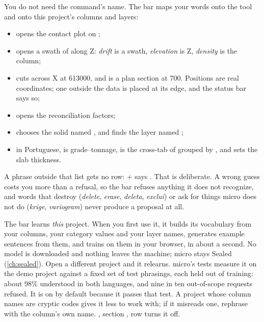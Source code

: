 You do not need the command's name. The bar maps your words onto the tool and onto this project's columns and layers:
\begin{itemize}
\item {} opens the contact plot on ;
\item {} opens a swath of  along Z: \emph{drift} is a swath, \emph{elevation} is Z, \emph{density} is the  column;
\item {} cuts across X at 613000, and  is a plan section at 700. Positions are real coordinates; one outside the data is placed at its edge, and the status bar says so;
\item {} opens the reconciliation factors;
\item {} chooses the solid named , and  finds the layer named ;
\item in Portuguese,  is grade--tonnage,  is the cross-tab of  grouped by , and  sets the slab thickness.
\end{itemize}

A phrase outside that list gets no row: + says . That is deliberate. A wrong guess costs you more than a refusal, so the bar refuses anything it does not recognize, and words that destroy (\emph{delete}, \emph{erase}, \emph{deleta}, \emph{exclui}) or ask for things micro does not do (\emph{krige}, \emph{variogram}) never produce a proposal at all.

The bar learns \emph{this} project. When you first use it, it builds its vocabulary from your columns, your category values and your layer names, generates example sentences from them, and trains on them in your browser, in about a second. No model is downloaded and nothing leaves the machine; micro stays Sealed (\cref{ch:sealed}). Open a different project and it relearns. micro's tests measure it on the demo project against a fixed set of test phrasings, each held out of training: about 98\% understood in both languages, and nine in ten out-of-scope requests refused. It is on by default because it passes that test. A project whose column names are cryptic codes gives it less to work with; if it misreads one, rephrase with the column's own name. , section , row  turns it off.

